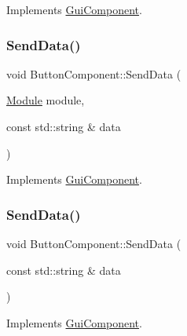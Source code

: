 Implements \mbox{\hyperlink{class_gui_component_ad136b2da6c63d7d3147f6cc411696cfe}{Gui\+Component}}.

\mbox{\label{class_button_component_ab2bda034c7b604ed198d5c276b7fd045}} 
\subsubsection{\texorpdfstring{SendData()}{SendData()}\hspace{0.1cm}{\footnotesize\ttfamily [1/2]}}
{\footnotesize\ttfamily void Button\+Component\+::\+Send\+Data (\begin{DoxyParamCaption}\item[{\mbox{\hyperlink{_mediator_2_mediator_2_commons_8h_a88683b64d84542943724ba0f211153af}{Module}}}]{module,  }\item[{const std\+::string \&}]{data }\end{DoxyParamCaption})\hspace{0.3cm}{\ttfamily [virtual]}}



Implements \mbox{\hyperlink{class_gui_component_a131dadcfcbe0278cf6c995a64cca871f}{Gui\+Component}}.

\mbox{\label{class_button_component_a4eb3aac3bc35d95f8d703da25697917c}} 
\subsubsection{\texorpdfstring{SendData()}{SendData()}\hspace{0.1cm}{\footnotesize\ttfamily [2/2]}}
{\footnotesize\ttfamily void Button\+Component\+::\+Send\+Data (\begin{DoxyParamCaption}\item[{const std\+::string \&}]{data }\end{DoxyParamCaption})\hspace{0.3cm}{\ttfamily [virtual]}}



Implements \mbox{\hyperlink{class_gui_component_a50da12b404e7ef1adbebafdabd66884f}{Gui\+Component}}.

\mbox{\label{class_button_component_a32986620f217bace2cbbd10fb73f34cd}} 
